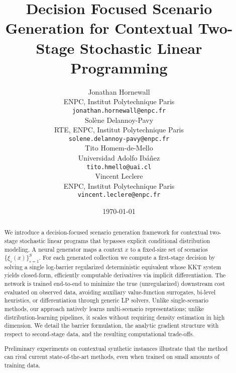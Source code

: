 \documentclass{article}
\title{Decision Focused Scenario Generation 
for Contextual Two-Stage Stochastic Linear Programming}
\author{
Jonathan Hornewall \\
ENPC, Institut Polytechnique Paris \\
\texttt{jonathan.hornewall@enpc.fr} \\
\And
Solène Delannoy-Pavy \\
RTE, ENPC, Institut Polytechnique Paris \\
\texttt{solene.delannoy-pavy@enpc.fr} \\
\And
Tito Homem-de-Mello \\
Universidad Adolfo Ibáñez \\
\texttt{tito.hmello@uai.cl} \\
\And
Vincent Leclere \\
ENPC, Institut Polytechnique Paris \\
\texttt{vincent.leclere@enpc.fr} \\
}
\date{\today}
\begin{document}
\maketitle

\begin{abstract}
    We introduce a decision-focused scenario generation framework for contextual
    two-stage stochastic linear programs that bypasses explicit conditional
    distribution modeling.
    A neural generator maps a context $x$ to a fixed-size set of scenarios
    $\{\xi_s(x)\}_{s=1}^S$.
    For each generated collection we compute a first-stage decision by solving a
    single log-barrier regularized deterministic equivalent whose KKT system yields
    closed-form, efficiently computable derivatives via implicit differentiation.
    The network is trained end-to-end to minimize the true (unregularized)
    downstream cost evaluated on observed data, avoiding auxiliary value-function
    surrogates, bi-level heuristics, or differentiation through generic LP solvers.
    Unlike single-scenario methods, our approach natively learns multi-scenario
    representations; unlike distribution-learning pipelines, it scales without
    requiring density estimation in high dimension.
    We detail the barrier formulation, the analytic gradient structure with respect
    to second-stage data, and the resulting computational trade-offs.

    Preliminary experiments on contextual synthetic instances illustrate that the
    method can rival current state-of-the-art methods, even when trained on
    small amounts of training data.
        




\end{abstract}
\end{document}
